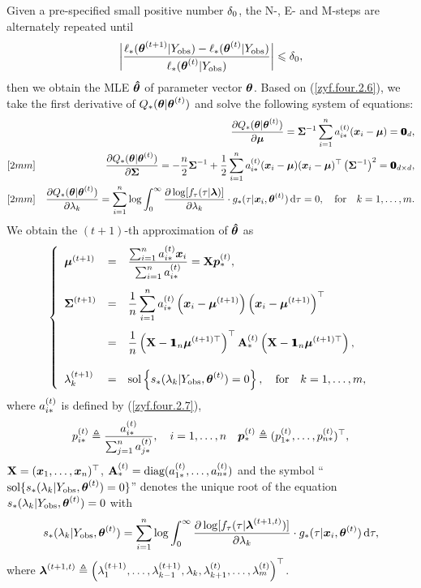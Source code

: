 Given a pre-specified small positive number $\de_0$, the N-, E- and M-steps are alternately repeated until
$$
    \bigg|\frac{\ell_*(\bthtt | \Y{obs}) - \ell_*(\btht | \Y{obs})}{\ell_*(\btht | \Y{obs})}\bigg| \le \de_0,
$$
then we obtain the MLE $\hbth$ of parameter vector $\bth$. Based on (\ref{zyf.four.2.6}), we take the first derivative of $Q_*(\bth | \btht)$ and solve the following system of equations:
\begin{eqnarray*}
    && \frac{\pa Q_*(\bth | \btht)}{\pa \bmu} = \bSi^{-1} \sum_{i=1}^n \at{i*}(\ibx_i - \bmu) = \0_d, \\ [2mm]
    && \frac{\pa Q_*(\bth | \btht)}{\pa \bSi} = -\frac{n}{2} \bSi^{-1} + \frac{1}{2} \sum_{i=1}^n \at{i*}(\ibx_i - \bmu)(\ibx_i - \bmu)^\top \left( \bSi^{-1} \right)^2 = \0_{d \times d}, \\ [2mm]
    && \frac{\pa Q_*(\bth | \btht)}{\pa \la_k} = \sum_{i=1}^n \log \int_0^\infty \frac{\pa \log[f_\tau(\tau|\bla)]}{\pa \la_k} \cdot g_*(\tau | \ibx_i, \btht) \rd \tau = 0, \qfor k = 1, \dots, m.
\end{eqnarray*}
We obtain the $(t+1)$-th approximation of $\hbth$ as
\begin{eqnarray}    \label{zyf.four.2.8}
    \left\{
    \begin{array}{lll}
        \bmutI &=& \dis \frac{\sum_{i=1}^n \at{i*} \ibx_i}{\sum_{i=1}^n \at{i*}} = \bX \ibpt{*}, \\ [6mm]
        \bSitI &=& \dis \frac{1}{n} \sum_{i=1}^n \at{i*} \left( \ibx_i - \bmutI\right) \left( \ibx_i - \bmutI\right)^\top \\ [6mm]
        &=& \dis \frac{1}{n}\left(\bX - \1_n \bmu^{(t+1)\top} \right)^\top \At{*} \left(\bX - \1_n\bmu^{(t+1)\top} \right), \\ [6mm]
        \latI_k &=& \dis \sol\left\{ s_*(\la_k | \Y{obs}, \btht) = 0 \right\}, \qfor k = 1, \dots, m,
    \end{array}
    \right.
\end{eqnarray}
where $\at{i*}$ is defined by (\ref{zyf.four.2.7}), 
$$
    \pt{i*} \teq \frac{\at{i*}}{\sum_{j=1}^n \at{j*}}, \quad i = 1, \dots, n \quad \ibpt{*} \teq (\pt{1*}, \dots, \pt{n*})^\top,  
$$
$\bX = (\ibx_1, \dots, \ibx_n)^\top$, $\At{*} = \diag(\at{1*}, \dots, \at{n*})$ and the symbol ``$\sol\{s_*(\la_k | \Y{obs}, \btht) = 0\}$'' denotes the unique root of the equation $s_*(\la_k | \Y{obs}, \btht) = 0$ with
$$
    s_*(\la_k | \Y{obs}, \btht) = \sum_{i=1}^n \log \int_0^\infty \frac{\pa \log[f_\tau(\tau|\bla^{(t+1,t)})]}{\pa \la_k} \cdot g_*(\tau | \ibx_i, \btht) \rd \tau,
$$
where $\bla^{(t+1,t)} \teq \left( \latI_1, \dots, \latI_{k-1}, \la_k, \lat_{k+1}, \dots, \lat_m \right)^\top$.

